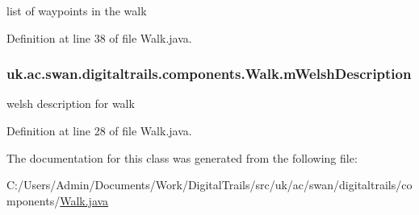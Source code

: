 list of waypoints in the walk 



Definition at line 38 of file Walk.\+java.

\hypertarget{classuk_1_1ac_1_1swan_1_1digitaltrails_1_1components_1_1_walk_a660b99698c634b548f4bbee778c36d33}{
\subsubsection[{m\+Welsh\+Description}]{ uk.\+ac.\+swan.\+digitaltrails.\+components.\+Walk.\+m\+Welsh\+Description\hspace{0.3cm}{\ttfamily [private]}}}\label{classuk_1_1ac_1_1swan_1_1digitaltrails_1_1components_1_1_walk_a660b99698c634b548f4bbee778c36d33}


welsh description for walk 



Definition at line 28 of file Walk.\+java.



The documentation for this class was generated from the following file\+:\begin{DoxyCompactItemize}
\item 
C\+:/\+Users/\+Admin/\+Documents/\+Work/\+Digital\+Trails/src/uk/ac/swan/digitaltrails/components/\hyperlink{_walk_8java}{Walk.\+java}\end{DoxyCompactItemize}
